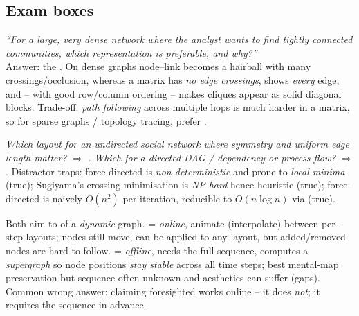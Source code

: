 \subsection{Exam boxes}

\begin{exambox}
\emph{``For a large, very dense network where the analyst wants to find tightly
connected communities, which representation is preferable, and why?''} \\
Answer: the . On dense graphs node--link becomes a
hairball with many crossings/occlusion, whereas a matrix has \emph{no edge
crossings}, shows \emph{every} edge, and -- with good row/column ordering --
makes cliques appear as solid diagonal blocks. Trade-off: \emph{path following}
across multiple hops is much harder in a matrix, so for sparse graphs / topology
tracing, prefer .
\end{exambox}

\begin{exambox}
\emph{Which layout for an undirected social network where symmetry and uniform
edge length matter?} $\Rightarrow$ . \emph{Which for a
directed DAG / dependency or process flow?} $\Rightarrow$ . Distractor traps: force-directed is \emph{non-deterministic} and prone
to \emph{local minima} (true); Sugiyama's crossing minimisation is
\emph{NP-hard} hence heuristic (true); force-directed is naively $O(n^2)$ per
iteration, reducible to $O(n\log n)$ via  (true).
\end{exambox}

\begin{exambox}
Both aim to  of a \emph{dynamic} graph.
 = \emph{online}, animate (interpolate) between per-step layouts;
nodes still move, can be applied to any layout, but added/removed nodes are hard
to follow.  = \emph{offline}, needs the full sequence,
computes a \emph{supergraph} so node positions \emph{stay stable} across all time
steps; best mental-map preservation but sequence often unknown and aesthetics can
suffer (gaps). Common wrong answer: claiming foresighted works online -- it does
\emph{not}; it requires the sequence in advance.
\end{exambox}
